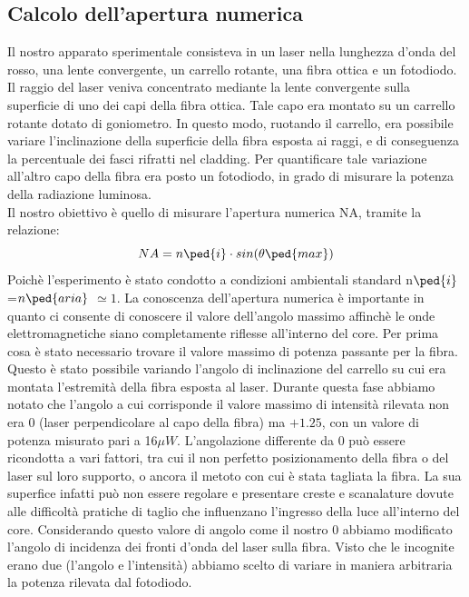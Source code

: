 \documentclass[a4paper,11pt]{article}
\begin{document}
\subsection{Calcolo dell'apertura numerica}
Il nostro apparato sperimentale consisteva in un laser nella lunghezza d'onda del rosso, una lente convergente, un carrello rotante, una fibra ottica e un fotodiodo. Il raggio del laser veniva concentrato mediante la lente convergente sulla superficie di uno dei capi della fibra ottica. Tale capo era montato su un carrello rotante dotato di goniometro. In questo modo, ruotando il carrello, era possibile variare l'inclinazione della superficie della fibra esposta ai raggi, e di conseguenza la percentuale dei fasci rifratti nel cladding. Per quantificare tale variazione all'altro capo della fibra era posto un fotodiodo, in grado di misurare la potenza della radiazione luminosa. \\
Il nostro obiettivo è quello di misurare l'apertura numerica NA, tramite la relazione: $$NA=n\ped{i}\cdot sin(\theta \ped{max}) $$  
Poichè l'esperimento è stato condotto a condizioni ambientali standard n$\ped{i}$=$n\ped{aria}$ $\simeq 1$. La conoscenza dell'apertura numerica è importante in quanto ci consente di conoscere il valore dell'angolo massimo affinchè le onde elettromagnetiche siano completamente riflesse all'interno del core. 
Per prima cosa è stato necessario trovare il valore massimo di potenza passante per la fibra. Questo è stato possibile variando l'angolo di inclinazione del carrello su cui era montata l'estremità della fibra esposta al laser. Durante questa fase abbiamo notato che l'angolo a cui corrisponde il valore massimo di intensità rilevata non era $ 0 $ (laser perpendicolare al capo della fibra) ma $ +1.25 $, con un valore di potenza misurato pari a 16$ \mu W $. L'angolazione differente da 0 può essere ricondotta a vari fattori, tra cui il non perfetto posizionamento della fibra o del laser sul loro supporto, o ancora il metoto con cui è stata tagliata la fibra. La sua superfice infatti può non essere regolare e presentare creste e scanalature dovute alle difficoltà pratiche di taglio che influenzano l'ingresso della luce all'interno del core.
Considerando questo valore di angolo come il nostro 0 abbiamo modificato l'angolo di incidenza dei fronti d'onda del laser sulla fibra.
Visto che le incognite erano due (l'angolo e l'intensità) abbiamo scelto di variare in maniera arbitraria la potenza rilevata dal fotodiodo. 
\end{document}
